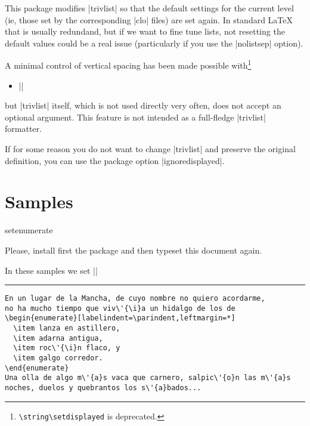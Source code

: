 \documentclass[a4paper]{ltxguide}
\newcommand\3{\unskip\enspace\fbox{\fontsize{4}{4}\selectfont NEW 3.0}}
\begin{document}
This package modifies |trivlist| so that the default settings for 
the current level (ie, those set by the corresponding |clo| 
files) are set again. In standard \LaTeX{} that is usually redundand, 
but if we want to fine tune lists, not resetting the default values 
could be a real issue (particularly if you use the |nolistsep| 
option).

A minimal control of vertical spacing has been made possible 
with\footnote{\verb|\string\setdisplayed| is deprecated.}
\begin{itemize}
\item ||
\end{itemize}
but |trivlist| itself, which is not used directly very
often, does not accept an optional argument. This feature
is not intended as a full-fledge |trivlist| formatter.

If for some reason you do not want to change |trivlist|
and preserve the original definition, you can use the
package option |ignoredisplayed|.

\section{Samples}

\expandafter\ifx\csname setenumerate\endcsname\relax

Please, install first the package and then typeset this
document again.

\else

In these samples we set ||

\small

\newcommand{\newsample}{\vskip6pt\goodbreak\hrule height 1pt\vskip6pt}
\newcommand{\samplesep}{\vskip6pt\goodbreak\hrule\vskip6pt}
\newbox\vsep
\setbox\vsep\hbox{\vrule height 2ex depth 16ex width 1pt}
\dp{}
\newcommand\showsep{\leavevmode\llap{\copy\vsep}}

\newsample

\begin{verbatim}
En un lugar de la Mancha, de cuyo nombre no quiero acordarme,
no ha mucho tiempo que viv\'{\i}a un hidalgo de los de
\begin{enumerate}[labelindent=\parindent,leftmargin=*]
  \item lanza en astillero,
  \item adarna antigua,
  \item roc\'{\i}n flaco, y
  \item galgo corredor.
\end{enumerate}
Una olla de algo m\'{a}s vaca que carnero, salpic\'{o}n las m\'{a}s
noches, duelos y quebrantos los s\'{a}bados...
\end{verbatim}
\end{document}
